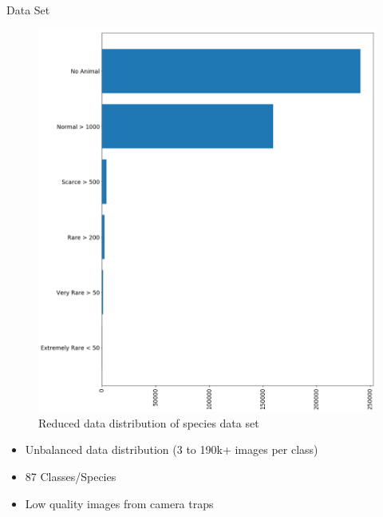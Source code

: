 \documentclass[10pt]{beamer}
\begin{document}
\begin{frame}{Data Set}
	\begin{minipage}[c]{0.48\linewidth}
		\centering
		\begin{figure}
			\includegraphics[width=\linewidth,height=.8\textheight,keepaspectratio]{images/Data_dist_sorted_reduced_v2.png}
			\caption{Reduced data distribution of species data set}
		\end{figure}
	\end{minipage}
	\hfill
	\begin{minipage}[c]{0.48\linewidth}
	\begin{itemize}
		\item Unbalanced data distribution (3 to 190k+ images per class)
		\item 87 Classes/Species
		\item Low quality images from camera traps
	\end{itemize}

	\end{minipage}
\end{frame}

\end{document}
